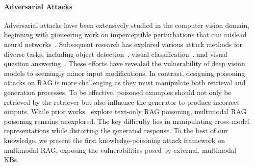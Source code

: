 \paragraph{Adversarial Attacks}
Adversarial attacks have been extensively studied in the computer vision domain, beginning with pioneering work on imperceptible perturbations that can mislead neural networks~\cite{szegedy2013intriguing,DBLP:journals/corr/GoodfellowSS14}.
Subsequent research has explored various attack methods for diverse tasks, including object detection~\cite{evtimov2017robust,xie2017adversarial,DBLP:conf/cvpr/EykholtEF0RXPKS18}, visual classification~\cite{kim2023effective, kim2022few, bansal2023cleanclip}, and visual question answering~\cite{huang2023improving}. 
These efforts have revealed the vulnerability of deep vision models to seemingly minor input modifications.
In contrast, designing poisoning attacks on RAG is more challenging as they must manipulate both retrieval and generation processes. To be effective, poisoned examples should not only be retrieved by the retriever but also influence the generator to produce incorrect outputs. While prior works~\cite{zou2024poisonedrag, tamber2025illusions} explore text-only RAG poisoning, multimodal RAG poisoning remains unexplored. The key difficulty lies in manipulating cross-modal representations while distorting the generated response. To the best of our knowledge, we present the first knowledge-poisoning attack framework on multimodal RAG, exposing the vulnerabilities posed by external, multimodal KBs. 



